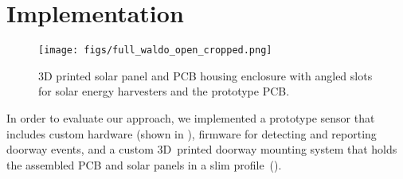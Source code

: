 \section{Implementation}
\label{sec:implementation}

\begin{figure}[t]
    \centering
    \texttt{[image: figs/full\_waldo\_open\_cropped.png]}
    \caption{3D printed solar panel and PCB housing enclosure with angled slots for solar energy harvesters and the \sysname prototype PCB.}
    \label{fig:mounting}
\end{figure}    


In order to evaluate our approach, we implemented a prototype \sysname sensor that includes custom hardware (shown in ), firmware for detecting and reporting doorway events, and a custom 3D~printed doorway mounting system that holds the assembled PCB and solar panels in a slim profile~().

